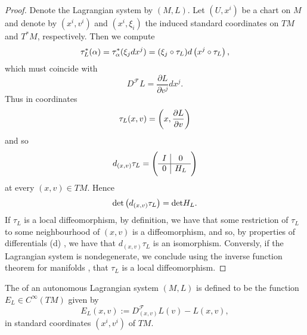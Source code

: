 \begin{proof}
	Denote the Lagrangian system by $(M,L)$. Let $(U,x^i)$ be a chart on $M$ and denote by $(x^i,v^i)$ and $(x^i,\xi_i)$ the induced standard coordinates on $TM$ and $T^*M$, respectively. Then we compute
	\begin{equation*}
		\tau^*_L(\alpha) = \tau^*_\alpha(\xi_j dx^j) = (\xi_j \circ \tau_L)d\del[1]{x^j \circ \tau_L},
	\end{equation*}
	\noindent which must coincide with
	\begin{equation*}
		D^\mathcal{F}L = \frac{\partial L}{\partial v^j}dx^j.
	\end{equation*}
	Thus in coordinates
	\begin{equation}
		\label{eq:Legendre_in_coordinates}
		\tau_L(x,v) = \del[3]{x,\frac{\partial L}{\partial v}}
	\end{equation}
	\noindent and so
	\begin{equation*}
		d_{(x,v)}\tau_L = \del{\begin{array}{c|c}
			I & 0\\\hline
			0 & H_L
		\end{array}}
	\end{equation*}
	\noindent at every $(x,v) \in TM$. Hence 
	\begin{equation*}
		\det \del[1]{d_{(x,v)}\tau_L} = \det H_L.
	\end{equation*}
	If $\tau_L$ is a local diffeomorphism, by definition, we have that some restriction of $\tau_L$ to some neighbourhood of $(x,v)$ is a diffeomorphism, and so, by properties of differentials (d) \cite[55]{lee:smooth_manifolds:2013}, we have that $d_{(x,v)}\tau_L$ is an isomorphism. Conversly, if the Lagrangian system is nondegenerate, we conclude using the inverse function theorem for manifolds \cite[79]{lee:smooth_manifolds:2013}, that $\tau_L$ is a local diffeomorphism.
\end{proof}

\begin{definition}[Energy]
	The  of an autonomous Lagrangian system $(M,L)$ is defined to be the function $E_L \in C^\infty(TM)$ given by
	\begin{equation*}
		E_L(x,v) := D^\mathcal{F}_{(x,v)}L(v) - L(x,v),
	\end{equation*}
	\noindent in standard coordinates $(x^i,v^i)$ of $TM$.
\end{definition}

